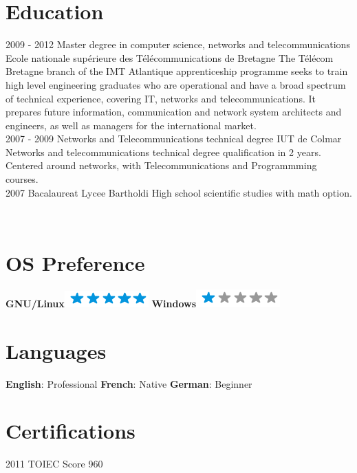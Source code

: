\documentclass[]{friggeri-cv}
\begin{document}
\newpage

\section{Education}
\begin{entrylist}
  \entry
    {2009 - 2012}
    {Master degree in computer science, networks and telecommunications}
    {Ecole nationale supérieure des Télécommunications de Bretagne}
    {The Télécom Bretagne branch of the IMT Atlantique apprenticeship programme seeks to train high level engineering graduates who are operational and have a broad spectrum of technical experience, covering IT, networks and telecommunications. It prepares future information, communication and network system architects and engineers, as well as managers for the international market.\\}
  \entry
    {2007 - 2009}
    {Networks and Telecommunications technical degree}
    {IUT de Colmar}
    {Networks and telecommunications technical degree qualification in 2 years. Centered around networks, with Telecommunications and Programmming courses.\\}
  \entry
    {2007}
    {Bacalaureat}
    {Lycee Bartholdi}
    {High school scientific studies with math option.}
\end{entrylist}

\begin{aside}
~
~
~
  \section{OS Preference}
    \textbf{GNU/Linux}\includegraphics[scale=0.40]{img/5stars.png}
    \textbf{Windows}\includegraphics[scale=0.40]{img/1stars.png}
    ~
  \section{Languages}
    \textbf{English}{: Professional}
    \textbf{French}{: Native}
    \textbf{German}{: Beginner}
    ~
\end{aside}

\section{Certifications}
\begin{entrylist}
  \entry
    {2011}
    {TOIEC}
    {Score 960}
    {}
\end{entrylist}
\end{document}
